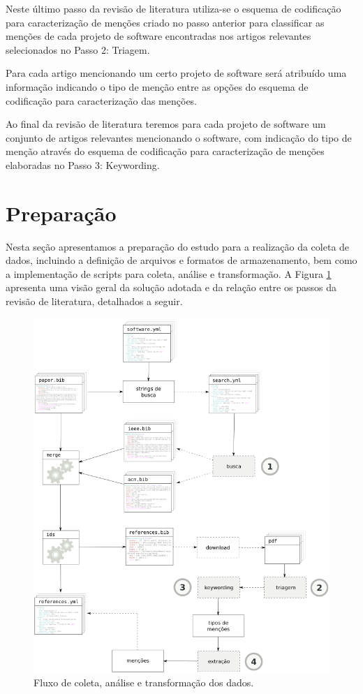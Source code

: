 Neste último passo da revisão de literatura utiliza-se o esquema de codificação
para caracterização de menções criado no passo anterior para classificar as
menções de cada projeto de software encontradas nos artigos relevantes
selecionados no Passo 2: Triagem.

Para cada artigo mencionando um certo projeto de software será atribuído uma
informação indicando o tipo de menção entre as opções do esquema de codificação
para caracterização das menções.

Ao final da revisão de literatura teremos para cada projeto de software um
conjunto de artigos relevantes mencionando o software, com indicação do tipo de menção
através do esquema de codificação para caracterização de menções elaboradas no Passo 3: Keywording.


\section{Preparação} \label{estudo2:preparacao} %

Nesta seção apresentamos a preparação do estudo para a realização da coleta de
dados, incluindo a definição de arquivos e formatos de armazenamento, bem como
a implementação de scripts para coleta, análise e transformação.
A Figura \ref{estudo2-fluxograma} apresenta uma visão geral da solução adotada
e da relação entre os passos da revisão de literatura, detalhados a seguir.

\begin{figure}[h]
  \center
  \includegraphics[scale=0.35]{imagens/estudo2-fluxograma.png}
  \caption{Fluxo de coleta, análise e transformação dos dados.}
  \label{estudo2-fluxograma}
\end{figure}

